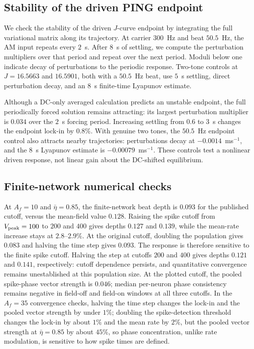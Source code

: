 \documentclass[11pt,a4paper]{article}
\providecommand{\DIFaddtex}[1]{{\protect\color{blue} \sf #1}} %
\providecommand{\DIFadd}[1]{\texorpdfstring{\DIFaddtex{#1}}{#1}} %
\begin{document}
\fi

\subsection{\DIFadd{Stability of the driven PING endpoint}}\label{app:ping-stability}
\DIFadd{We check the stability of the driven $J$-curve endpoint by integrating the full
variational matrix along its trajectory. At carrier $300$~Hz and beat $50.5$~Hz,
the AM input repeats every $2$~s. After $8$~s of settling, we compute the
perturbation multipliers over that period and repeat over the next period.
Moduli below one indicate decay of perturbations to the periodic response.
Two-tone controls at $J=16.5663$ and $16.5901$, both with a $50.5$~Hz beat,
use $5$~s settling, direct perturbation decay, and an $8$~s finite-time
Lyapunov estimate.
}

\DIFadd{Although a DC-only averaged calculation predicts an unstable endpoint, the full
periodically forced solution remains attracting: its largest perturbation
multiplier is $0.034$ over the $2$~s forcing period. Increasing settling from
$0.6$ to $3$~s changes the endpoint lock-in by $0.8\%$. With genuine two tones,
the $50.5$~Hz endpoint control also attracts nearby trajectories: perturbations
decay at $-0.0014$~ms$^{-1}$, and the $8$~s Lyapunov estimate is
$-0.00079$~ms$^{-1}$. These controls test a nonlinear driven response, not linear
gain about the DC-shifted equilibrium.
}

\subsection{\DIFadd{Finite-network numerical checks}}\label{app:qif-checks}
\DIFadd{At $A_f=10$ and $\bar\eta=0.85$, the finite-network beat depth is $0.093$
for the published cutoff, versus the mean-field value $0.128$. Raising the spike cutoff from $V_{\rm peak}=100$ to
$200$ and $400$ gives depths $0.127$ and $0.139$, while the mean-rate increase
stays at $2.8$--$2.9\%$. At the original cutoff, doubling the population gives
$0.083$ and halving the time step gives $0.093$. The response is therefore
sensitive to the finite spike cutoff. Halving the step at cutoffs $200$ and
$400$ gives depths $0.121$ and $0.141$, respectively: cutoff dependence persists,
and quantitative convergence remains unestablished at this population size.
At the plotted cutoff, the pooled spike-phase vector strength is $0.046$;
median per-neuron phase consistency remains negative in field-off and field-on
windows at all three cutoffs.
In the $A_f=35$ convergence checks, halving the time step changes the lock-in and the pooled vector
strength by under $1\%$; doubling the spike-detection threshold changes the lock-in by
about $1\%$ and the mean rate by $2\%$, but the pooled vector strength at
$\bar\eta=0.85$ by about $45\%$, so phase concentration, unlike rate modulation, is sensitive to
how spike times are defined.
}
\end{document}
